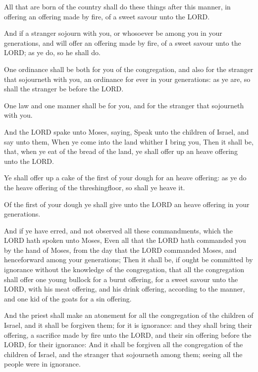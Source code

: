 \Verse All that are born of the country shall do these things after
this manner, in offering an offering made by fire, of a sweet savour
unto the LORD.

\Verse And if a stranger sojourn with you, or whosoever be among you in
your generations, and will offer an offering made by fire, of a sweet
savour unto the LORD; as ye do, so he shall do.

\Verse One ordinance shall be both for you of the congregation, and
also for the stranger that sojourneth with you, an ordinance for ever
in your generations: as ye are, so shall the stranger be before the
LORD.

\Verse One law and one manner shall be for you, and for the stranger
that sojourneth with you.

\Verse And the LORD spake unto Moses, saying, \Verse Speak unto the
children of Israel, and say unto them, When ye come into the land
whither I bring you, \Verse Then it shall be, that, when ye eat of the
bread of the land, ye shall offer up an heave offering unto the LORD.

\Verse Ye shall offer up a cake of the first of your dough for an heave
offering: as ye do the heave offering of the threshingfloor, so shall
ye heave it.

\Verse Of the first of your dough ye shall give unto the LORD an heave
offering in your generations.

\Verse And if ye have erred, and not observed all these commandments,
which the LORD hath spoken unto Moses, \Verse Even all that the LORD
hath commanded you by the hand of Moses, from the day that the LORD
commanded Moses, and henceforward among your generations; \Verse Then
it shall be, if ought be committed by ignorance without the knowledge
of the congregation, that all the congregation shall offer one young
bullock for a burnt offering, for a sweet savour unto the LORD, with
his meat offering, and his drink offering, according to the manner,
and one kid of the goats for a sin offering.

\Verse And the priest shall make an atonement for all the congregation
of the children of Israel, and it shall be forgiven them; for it is
ignorance: and they shall bring their offering, a sacrifice made by
fire unto the LORD, and their sin offering before the LORD, for their
ignorance: \Verse And it shall be forgiven all the congregation of the
children of Israel, and the stranger that sojourneth among them;
seeing all the people were in ignorance.

